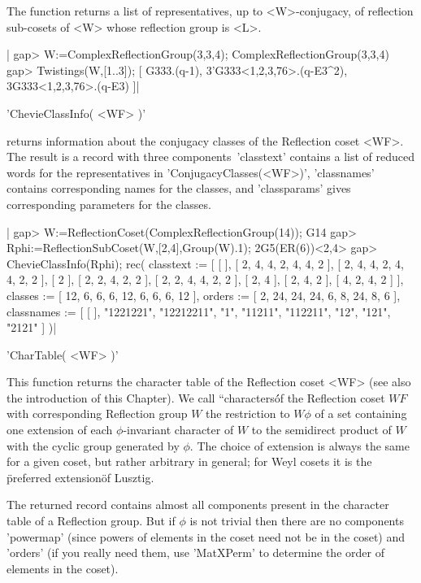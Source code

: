 The  function returns  a list  of representatives,  up to <W>-conjugacy, of
reflection sub-cosets of <W> whose reflection group is <L>.

|    gap> W:=ComplexReflectionGroup(3,3,4);
    ComplexReflectionGroup(3,3,4)
    gap> Twistings(W,[1..3]);
    [ G333.(q-1), 3'G333<1,2,3,76>.(q-E3^2), 3G333<1,2,3,76>.(q-E3) ]|


'ChevieClassInfo( <WF> )'

returns  information about  the conjugacy  classes of  the Reflection coset
<WF>.  The result is a record with three components\:\ 'classtext' contains
a list of reduced words for the representatives in
'ConjugacyClasses(<WF>)', 'classnames' contains corresponding names for the
classes, and 'classparams' gives corresponding parameters for the classes.

|    gap> W:=ReflectionCoset(ComplexReflectionGroup(14));
    G14
    gap> Rphi:=ReflectionSubCoset(W,[2,4],Group(W).1);
    2G5(ER(6))<2,4>
    gap> ChevieClassInfo(Rphi);
    rec(
      classtext := 
       [ [  ], [ 2, 4, 4, 2, 4, 4, 2 ], [ 2, 4, 4, 2, 4, 4, 2, 2 ],
          [ 2 ], [ 2, 2, 4, 2, 2 ], [ 2, 2, 4, 4, 2, 2 ], [ 2, 4 ], 
          [ 2, 4, 2 ], [ 4, 2, 4, 2 ] ],
      classes := [ 12, 6, 6, 6, 12, 6, 6, 6, 12 ],
      orders := [ 2, 24, 24, 24, 6, 8, 24, 8, 6 ],
      classnames := 
       [ [  ], "1221221", "12212211", "1", "11211", "112211", "12",
          "121", "2121" ] )|


'CharTable(  <WF> )'

This function returns the character table of the Reflection coset <WF> (see
also  the introduction  of this  Chapter). We  call ``characters\'\' of the
Reflection   coset  $WF$  with  corresponding   Reflection  group  $W$  the
restriction  to  $W  \phi$  of  a  set  containing  one  extension  of each
$\phi$-invariant character of $W$ to the semidirect product of $W$ with the
cyclic  group generated  by $\phi$.  The choice  of extension is always the
same for a given coset, but rather arbitrary in general; for Weyl cosets it
is the \"preferred extension\" of Lusztig.

The returned record contains almost all components present in the character
table of a Reflection group. But if $\phi$ is not trivial then there are no
components 'powermap' (since powers of elements in the coset need not be in
the  coset)  and  'orders'  (if  you  really  need  them, use 'MatXPerm' to
determine the order of elements in the coset).

